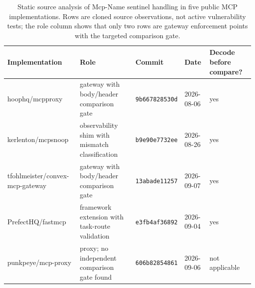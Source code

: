 \begin{table}[t]
  \caption{Static source analysis of Mcp-Name sentinel handling in
  five public MCP implementations. Rows are cloned source observations, not
  active vulnerability tests; the role column shows that only two rows are
  gateway enforcement points with the targeted comparison gate.}
  \label{tab:public-gateway-analysis}
  \centering\tiny
  \begin{tabular}{@{}p{}p{}p{}p{}p{}@{}}
    \toprule
    Implementation & Role & Commit & Date & Decode before compare? \\
    \midrule
    hoophq/mcpproxy & gateway with body/header comparison gate & \texttt{9b667828530d} & 2026-08-06 & yes \\
    kerlenton/mcpsnoop & observability shim with mismatch classification & \texttt{b9e90e7732ee} & 2026-08-26 & yes \\
    tfohlmeister/convex-mcp-gateway & gateway with body/header comparison gate & \texttt{13abade11257} & 2026-09-07 & yes \\
    PrefectHQ/fastmcp & framework extension with task-route validation & \texttt{e3fb4af36892} & 2026-09-04 & yes \\
    punkpeye/mcp-proxy & proxy; no independent comparison gate found & \texttt{606b82854861} & 2026-09-06 & not applicable \\
    \bottomrule
  \end{tabular}
\end{table}
